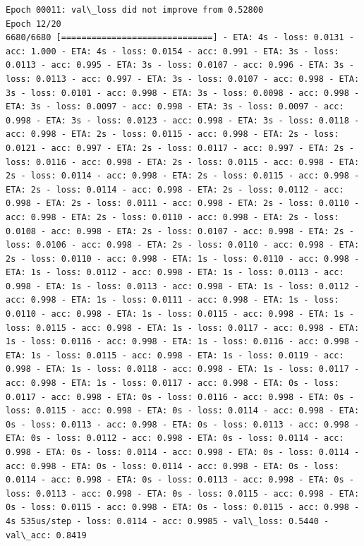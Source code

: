 \documentclass[11pt]{article}
\begin{document}
\begin{Verbatim}[commandchars=\\\{\}]
Epoch 00011: val\_loss did not improve from 0.52800
Epoch 12/20
6680/6680 [==============================] - ETA: 4s - loss: 0.0131 - acc: 1.000 - ETA: 4s - loss: 0.0154 - acc: 0.991 - ETA: 3s - loss: 0.0113 - acc: 0.995 - ETA: 3s - loss: 0.0107 - acc: 0.996 - ETA: 3s - loss: 0.0113 - acc: 0.997 - ETA: 3s - loss: 0.0107 - acc: 0.998 - ETA: 3s - loss: 0.0101 - acc: 0.998 - ETA: 3s - loss: 0.0098 - acc: 0.998 - ETA: 3s - loss: 0.0097 - acc: 0.998 - ETA: 3s - loss: 0.0097 - acc: 0.998 - ETA: 3s - loss: 0.0123 - acc: 0.998 - ETA: 3s - loss: 0.0118 - acc: 0.998 - ETA: 2s - loss: 0.0115 - acc: 0.998 - ETA: 2s - loss: 0.0121 - acc: 0.997 - ETA: 2s - loss: 0.0117 - acc: 0.997 - ETA: 2s - loss: 0.0116 - acc: 0.998 - ETA: 2s - loss: 0.0115 - acc: 0.998 - ETA: 2s - loss: 0.0114 - acc: 0.998 - ETA: 2s - loss: 0.0115 - acc: 0.998 - ETA: 2s - loss: 0.0114 - acc: 0.998 - ETA: 2s - loss: 0.0112 - acc: 0.998 - ETA: 2s - loss: 0.0111 - acc: 0.998 - ETA: 2s - loss: 0.0110 - acc: 0.998 - ETA: 2s - loss: 0.0110 - acc: 0.998 - ETA: 2s - loss: 0.0108 - acc: 0.998 - ETA: 2s - loss: 0.0107 - acc: 0.998 - ETA: 2s - loss: 0.0106 - acc: 0.998 - ETA: 2s - loss: 0.0110 - acc: 0.998 - ETA: 2s - loss: 0.0110 - acc: 0.998 - ETA: 1s - loss: 0.0110 - acc: 0.998 - ETA: 1s - loss: 0.0112 - acc: 0.998 - ETA: 1s - loss: 0.0113 - acc: 0.998 - ETA: 1s - loss: 0.0113 - acc: 0.998 - ETA: 1s - loss: 0.0112 - acc: 0.998 - ETA: 1s - loss: 0.0111 - acc: 0.998 - ETA: 1s - loss: 0.0110 - acc: 0.998 - ETA: 1s - loss: 0.0115 - acc: 0.998 - ETA: 1s - loss: 0.0115 - acc: 0.998 - ETA: 1s - loss: 0.0117 - acc: 0.998 - ETA: 1s - loss: 0.0116 - acc: 0.998 - ETA: 1s - loss: 0.0116 - acc: 0.998 - ETA: 1s - loss: 0.0115 - acc: 0.998 - ETA: 1s - loss: 0.0119 - acc: 0.998 - ETA: 1s - loss: 0.0118 - acc: 0.998 - ETA: 1s - loss: 0.0117 - acc: 0.998 - ETA: 1s - loss: 0.0117 - acc: 0.998 - ETA: 0s - loss: 0.0117 - acc: 0.998 - ETA: 0s - loss: 0.0116 - acc: 0.998 - ETA: 0s - loss: 0.0115 - acc: 0.998 - ETA: 0s - loss: 0.0114 - acc: 0.998 - ETA: 0s - loss: 0.0113 - acc: 0.998 - ETA: 0s - loss: 0.0113 - acc: 0.998 - ETA: 0s - loss: 0.0112 - acc: 0.998 - ETA: 0s - loss: 0.0114 - acc: 0.998 - ETA: 0s - loss: 0.0114 - acc: 0.998 - ETA: 0s - loss: 0.0114 - acc: 0.998 - ETA: 0s - loss: 0.0114 - acc: 0.998 - ETA: 0s - loss: 0.0114 - acc: 0.998 - ETA: 0s - loss: 0.0113 - acc: 0.998 - ETA: 0s - loss: 0.0113 - acc: 0.998 - ETA: 0s - loss: 0.0115 - acc: 0.998 - ETA: 0s - loss: 0.0115 - acc: 0.998 - ETA: 0s - loss: 0.0115 - acc: 0.998 - 4s 535us/step - loss: 0.0114 - acc: 0.9985 - val\_loss: 0.5440 - val\_acc: 0.8419


\end{Verbatim}
\end{document}
